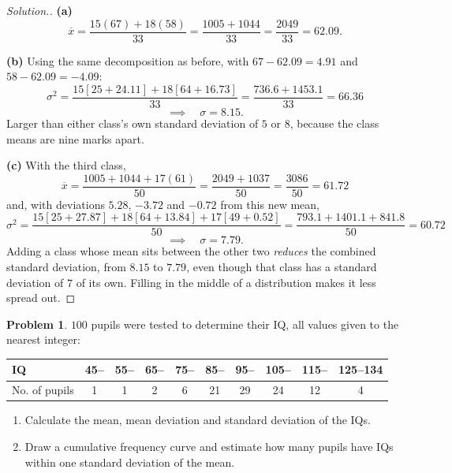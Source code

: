 \documentclass[11pt,a4paper]{article}
\theoremstyle{definition}
\newtheorem{problemx}{Problem}[section]
\newenvironment{problem}{\begin{problemx}}{\end{problemx}}
\newenvironment{solution}
  {\renewcommand{\qedsymbol}{}\begin{proof}[\textit{Solution}.]}
  {\end{proof}}
\begin{document}
\begin{solution}
\textbf{(a)}
\[\overline{x}=\frac{15(67)+18(58)}{33}=\frac{1005+1044}{33}=\frac{2049}{33}=62.09.\]

\textbf{(b)} Using the same decomposition as before, with $67-62.09=4.91$ and
$58-62.09=-4.09$:
\[\sigma^2=\frac{15\left[25+24.11\right]+18\left[64+16.73\right]}{33}
=\frac{736.6+1453.1}{33}=66.36\]
\[\implies\quad \sigma=8.15.\]
Larger than either class's own standard deviation of $5$ or $8$, because the class means are
nine marks apart.

\textbf{(c)} With the third class,
\[\overline{x}=\frac{1005+1044+17(61)}{50}=\frac{2049+1037}{50}=\frac{3086}{50}=61.72\]
and, with deviations $5.28$, $-3.72$ and $-0.72$ from this new mean,
\[\sigma^2=\frac{15\left[25+27.87\right]+18\left[64+13.84\right]+17\left[49+0.52\right]}{50}
=\frac{793.1+1401.1+841.8}{50}=60.72\]
\[\implies\quad \sigma=7.79.\]
Adding a class whose mean sits between the other two \emph{reduces} the combined standard
deviation, from $8.15$ to $7.79$, even though that class has a standard deviation of $7$ of
its own. Filling in the middle of a distribution makes it less spread out.
\end{solution}

\begin{problem}
$100$ pupils were tested to determine their IQ, all values given to the nearest integer:
\begin{table}[H]
\centering
\begin{tabular}{|l|c|c|c|c|c|c|c|c|c|}
\hline
IQ & 45-- & 55-- & 65-- & 75-- & 85-- & 95-- & 105-- & 115-- & 125--134\\
\hline
No. of pupils & 1 & 1 & 2 & 6 & 21 & 29 & 24 & 12 & 4\\
\hline
\end{tabular}
\end{table}
\begin{enumerate}
\item[(a).] Calculate the mean, mean deviation and standard deviation of the IQs.
\item[(b).] Draw a cumulative frequency curve and estimate how many pupils have IQs within
one standard deviation of the mean.
\end{enumerate}
\end{problem}
\end{document}
